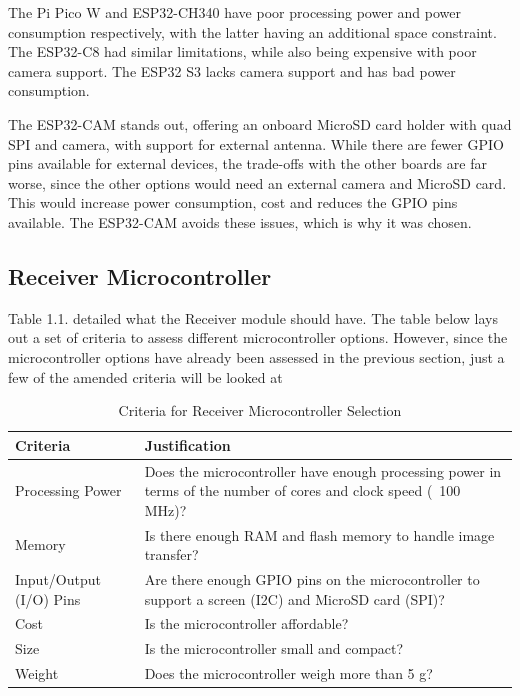 The Pi Pico W and ESP32-CH340 have poor processing power and power consumption respectively, with the latter having an additional space constraint. The ESP32-C8 had similar limitations, while also being expensive with poor camera support. The ESP32 S3 lacks camera support and has bad power consumption. 

The ESP32-CAM stands out, offering an onboard MicroSD card holder with quad SPI and camera, with support for external antenna. While there are fewer GPIO pins available for external devices, the trade-offs with the other boards are far worse, since the other options would need an external camera and MicroSD card. This would increase power consumption, cost and reduces the GPIO pins available. The ESP32-CAM avoids these issues, which is why it was chosen. 


\subsection{Receiver Microcontroller}

Table 1.1. detailed what the Receiver module should have. The table below lays out a set of criteria to assess different microcontroller options. However, since the microcontroller options have already been assessed in the previous section, just a few of the amended criteria will be looked at
\begin{table}[h]
\centering
\begin{tabular}{|l|p{10cm}|}
\hline
\textbf{Criteria} & \textbf{Justification} \\
\hline
Processing Power & Does the microcontroller have enough processing power in terms of the number of cores and clock speed (~100 MHz)? \\
\hline
Memory & Is there enough RAM and flash memory to handle image transfer? \\
\hline
Input/Output (I/O) Pins & Are there enough GPIO pins on the microcontroller to support a screen (I2C) and MicroSD card (SPI)? \\
\hline
Cost & Is the microcontroller affordable? \\
\hline
Size & Is the microcontroller small and compact? \\
\hline
Weight & Does the microcontroller weigh more than 5 g? \\
\hline
\end{tabular}
\caption{Criteria for Receiver Microcontroller Selection}
\label{tab:microcontroller_criteria}
\end{table}

